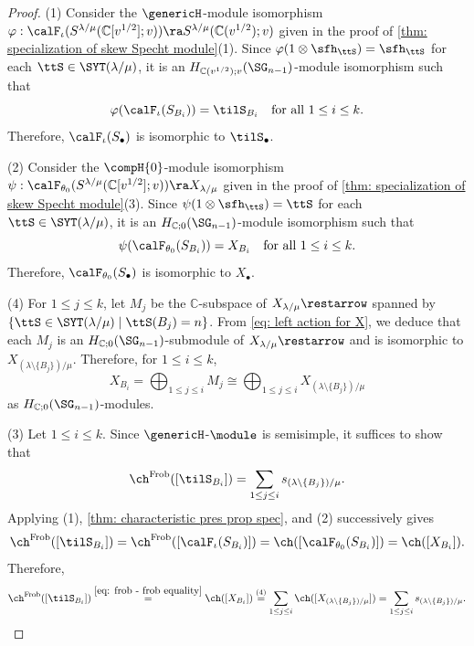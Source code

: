 \documentclass[12pt, reqno]{amsart}
\theoremstyle{plain}
\theoremstyle{definition}
\numberwithin{equation}{section}
\numberwithin{figure}{section}
\numberwithin{table}{section}
\def\C{\mathbb C}
\begin{document}
\begin{proof}
(1) Consider the $\genericH$-module isomorphism $\varphi: \calF_{\iota}(S^{\lambda/\mu}(\C[v^{1/2}];v)) \ra S^{\lambda/\mu}(\C(v^{1/2});v)$ given in the proof of \cref{thm: specialization of skew Specht module}(1).
Since $\varphi(1 \otimes \sfh_{\ttS}) = \sfh_{\ttS}$ for each  $\ttS \in \SYT(\lambda/\mu)$, it is an $H_{\C(v^{1/2});v}(\SG_{n-1})$-module isomorphism such that
\[
\varphi(\calF_\iota(S_{B_i})) = \tilS_{B_i} \quad\text{for all $1 \leq i \leq k$}.
\]
Therefore, $\calF_{\iota}(S_{\bullet})$ is isomorphic to $\tilS_{\bullet}$.


(2) Consider the $\compH{0}$-module isomorphism $\psi: \calF_{\theta_0}(S^{\lambda/\mu}(\C[v^{1/2}];v)) \ra X_{\lambda/\mu}$ given in the proof of \cref{thm: specialization of skew Specht module}(3).
Since $\psi(1 \otimes \sfh_{\ttS}) = \ttS$ for each $\ttS \in \SYT(\lambda/\mu)$, it is an $H_{\C;0}(\SG_{n-1})$-module isomorphism such that  
\[
\psi(\calF_{\theta_0}(S_{B_i})) = X_{B_i} \quad\text{for all $1 \leq i \leq k$.}
\]
Therefore, $\calF_{\theta_0}(S_{\bullet})$ is isomorphic to $X_{\bullet}$.


(4) For $1 \leq j \leq k$, let $M_j$ be the $\C$-subspace of
$X_{\lambda/\mu}\restarrow$ spanned by
$\{\ttS \in \SYT(\lambda/\mu) \mid \ttS(B_j)=n\}$.
From \cref{eq: left action for X}, we deduce that each $M_j$ is an
$H_{\C;0}(\SG_{n-1})$-submodule of
$X_{\lambda/\mu}\restarrow$ and is isomorphic to
$X_{(\lambda\setminus\{B_j\})/\mu}$.
Therefore, for $1 \leq i \leq k$, 
\[
X_{B_i}
=
\bigoplus_{1 \leq j \leq i} M_j
\cong
\bigoplus_{1 \leq j \leq i}
X_{(\lambda\setminus\{B_j\})/\mu}
\]
as $H_{\C;0}(\SG_{n-1})$-modules.

(3)
Let $1 \leq i \leq k$.
Since $\genericH$-$\module$ is semisimple, it suffices to show that 
\[
\ch^{\rm Frob}([\tilS_{B_i}]) = \sum_{1 \leq j\leq i} s_{(\lambda \setminus \{B_j\})/\mu}.
\]
Applying (1), \cref{thm: characteristic pres prop spec}, and (2) successively gives 
\begin{align}\label{eq: frob - frob equality}
\ch^{\rm Frob}([\tilS_{B_i}]) = 
\ch^{\rm Frob}([\calF_{\iota}(S_{B_i})]) = \ch([\calF_{\theta_0}(S_{B_i})]) = \ch([X_{B_i}]).
\end{align}
Therefore,
\[
\ch^{\rm Frob}([\tilS_{B_{i}}]) 
\overset{\cref{eq: frob - frob equality}}{=} \ch([X_{B_i}]) 
\overset{(4)}{=} \sum_{1 \leq j \leq i} 
\ch([X_{(\lambda \setminus \{B_j\})/\mu}])
= \sum_{1 \leq j \leq i} s_{(\lambda \setminus \{B_j\})/\mu}. \qedhere
\]
\end{proof}
\end{document}
